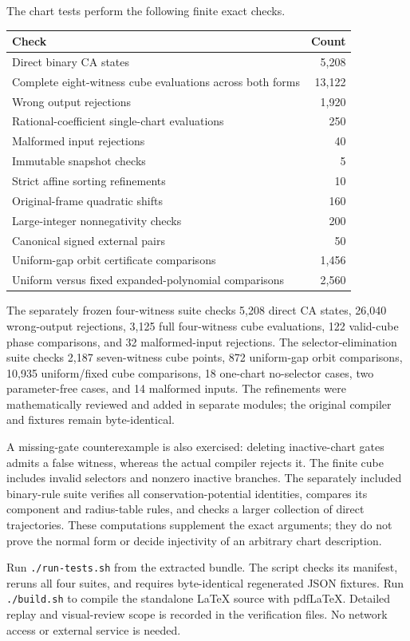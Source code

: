 \documentclass[11pt,letterpaper]{article}
\numberwithin{equation}{section}
\theoremstyle{definition}
\theoremstyle{remark}
\begin{document}
The chart tests perform the following finite exact checks.
\begin{center}
\begin{tabular}{lr}
\toprule
Check & Count\\
\midrule
Direct binary CA states & 5,208\\
Complete eight-witness cube evaluations across both forms & 13,122\\
Wrong output rejections & 1,920\\
Rational-coefficient single-chart evaluations & 250\\
Malformed input rejections & 40\\
Immutable snapshot checks & 5\\
Strict affine sorting refinements & 10\\
Original-frame quadratic shifts & 160\\
Large-integer nonnegativity checks & 200\\
Canonical signed external pairs & 50\\
Uniform-gap orbit certificate comparisons & 1,456\\
Uniform versus fixed expanded-polynomial comparisons & 2,560\\
\bottomrule
\end{tabular}
\end{center}
The separately frozen four-witness suite checks 5,208 direct CA states,
26,040 wrong-output rejections, 3,125 full four-witness cube evaluations,
122 valid-cube phase comparisons, and 32 malformed-input rejections.
The selector-elimination suite checks 2,187 seven-witness cube points,
872 uniform-gap orbit comparisons, 10,935 uniform/fixed cube comparisons,
18 one-chart no-selector cases, two parameter-free cases, and 14 malformed
inputs. The refinements were mathematically reviewed and added in separate
modules; the original compiler and fixtures remain byte-identical.

A missing-gate counterexample is also exercised: deleting inactive-chart
gates admits a false witness, whereas the actual compiler rejects it.
The finite cube includes invalid selectors and nonzero inactive branches.
The separately included binary-rule suite verifies all conservation-potential
identities, compares its component and radius-table rules, and checks a
larger collection of direct trajectories. These computations supplement the
exact arguments; they do not prove the normal form or decide injectivity of
an arbitrary chart description.

Run \texttt{./run-tests.sh} from the extracted bundle. The script checks its
manifest, reruns all four suites, and requires byte-identical regenerated JSON
fixtures. Run \texttt{./build.sh} to compile the standalone LaTeX source with
pdfLaTeX. Detailed replay and visual-review scope is recorded in the
verification files. No network access or external service is needed.
\end{document}
